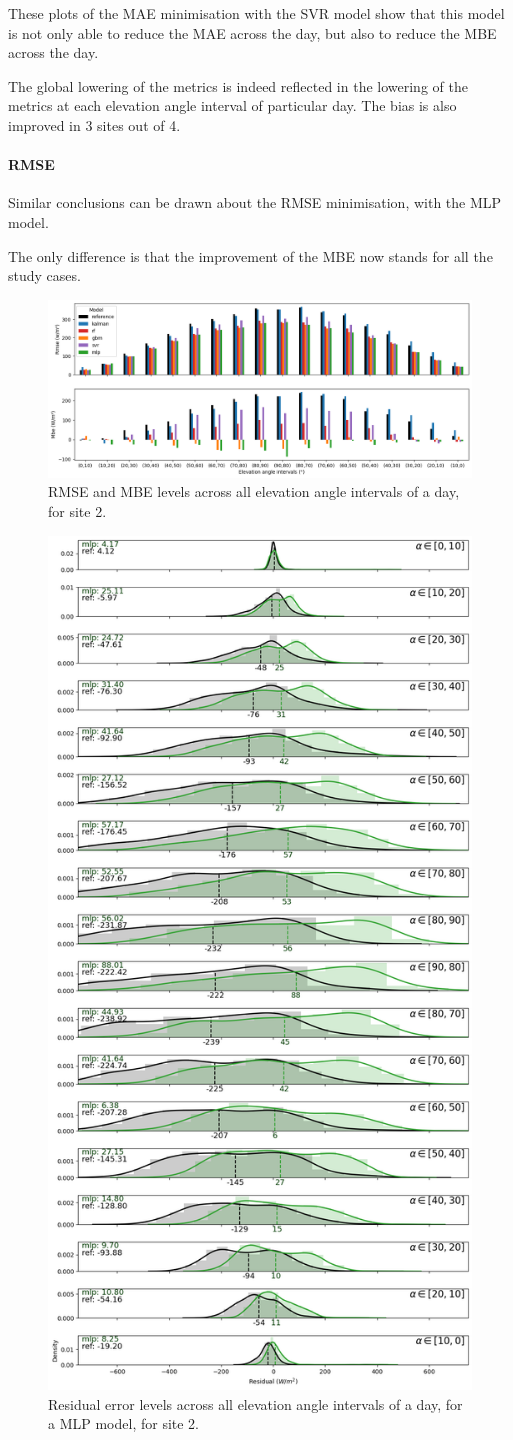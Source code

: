 These plots of the MAE minimisation with the SVR model show that this model is not only able to reduce the MAE across the day, but also to reduce the MBE across the day.

The global lowering of the metrics is indeed reflected in the lowering of the metrics at each elevation angle interval of particular day. The bias is also improved in 3 sites out of 4.
\paragraph{RMSE}\indent

Similar conclusions can be drawn about the RMSE minimisation, with the MLP model.

The only difference is that the improvement of the MBE now stands for all the study cases.

\begin{figure}[htb!]
    \centering
    \includegraphics[width=\columnwidth]{figures/first_study/rmse_mbe_site2.png}
\caption{RMSE and MBE levels across all elevation angle intervals of a day, for site 2.}
\end{figure}
\newpage

\begin{figure}[htb!]
    \centering
    \includegraphics[width=0.47\columnwidth]{figures/first_study/residual_errors_mlp_site2_rmse.png}
\caption{Residual error levels across all elevation angle intervals of a day, for a MLP model, for site 2.}
\end{figure}

